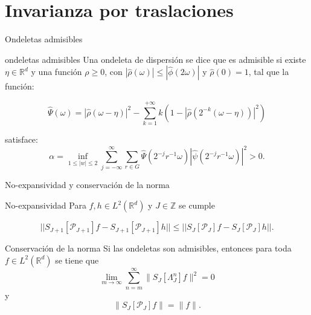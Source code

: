 \documentclass[aspectratio=43]{beamer}
\begin{document}
\section{Invarianza por traslaciones}

\begin{frame}{Ondeletas admisibles}

  \begin{block}{ondeletas admisibles}
    Una ondeleta de dispersión se dice que es admisible si existe $\eta \in \mathbb{R}^d$ y una función $\rho \geq 0$, con $|\widehat{\rho}(\omega)| \leq |\widehat{\phi}(2\omega)|$ y $\widehat{\rho}(0)=1$, tal que la función:

    \begin{equation*}\label{eq::1.6}
      \widehat{\Psi}(\omega)=|\widehat{\rho}(\omega - \eta)|^2 - \sum_{k=1}^{+\infty} k(1-|\widehat{\rho}(2^{-k}(\omega - \eta))|^2)
    \end{equation*}

    \noindent satisface:
    \begin{equation*} \label{eq::1.7}
      \alpha= \inf_{1\leq|w|\leq2} \sum_{j=-\infty}^{\infty} \sum_{r\in G} \widehat{\Psi} (2^{-j}r^{-1}\omega)|\widehat{\psi}(2^{-j}r^{-1}\omega)|^2>0.
    \end{equation*}
  \end{block}


\end{frame}

\begin{frame}{No-expansividad y conservación de la norma}

  \begin{alertblock}{No-expansividad}
    \noindent Para $f,h \in L^2(\mathbb{R}^d)$ y $J\in \mathbb{Z}$ se cumple

    \begin{equation*} \label{eq::1.10}
      || S_{J+1} [\mathcal{P}_{J+1}]f- S_{J+1}[\mathcal{P}_{J+1}]h || \leq ||S_J[\mathcal{P}_J]f - S_J[\mathcal{P}_J]h ||.
    \end{equation*}
  \end{alertblock}

  \begin{alertblock}{Conservación de la norma}
    Si las ondeletas son admisibles, entonces para toda $f\in L^2(\mathbb{R}^d)$ se tiene que
    \begin{equation*}
      \lim_{m\rightarrow\infty} \sum_{n=m}^{\infty} \|S_J[\Lambda_J^n]f\|^2=0
    \end{equation*}
    y
    \begin{equation*}
      \|S_J[\mathcal{P}_J]f\|=\|f\|.
    \end{equation*}
  \end{alertblock}
\end{frame}
\end{document}
